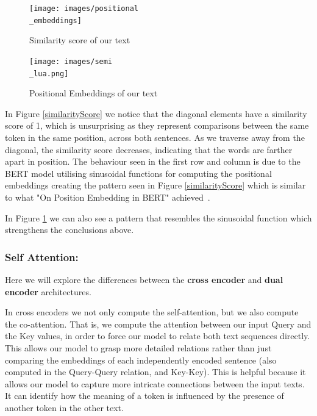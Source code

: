 \documentclass[runningheads]{llncs}
\begin{document}
\begin{figure}[htbp]
    \centering
    \begin{minipage}{0.5\textwidth}
        \centering
        \texttt{[image: images/positional\\\_embeddings]}
        \caption{Similarity score of our text}
        \label{similarityScore}
    \end{minipage}\hfill
    \begin{minipage}{0.45\textwidth}
        \centering
        \texttt{[image: images/semi\\\_lua.png]}
        \caption{Positional Embeddings of our text}
         \label{posEmb}
    \end{minipage}
\end{figure}

In Figure \ref{similarityScore} we notice that the diagonal elements have a similarity score of 1, which is unsurprising as they represent comparisons between the same token in the same position, across both sentences. As we traverse away from the diagonal, the similarity score decreases, indicating that the words are farther apart in position. The behaviour seen in the first row and column is due to the BERT model utilising sinusoidal functions for computing the positional embeddings creating the pattern seen in Figure \ref{similarityScore} which is similar to what "On Position Embedding in BERT" achieved~\cite{wang2021on}.

In Figure \ref{posEmb} we can also see a pattern that resembles the sinusoidal function which strengthens the conclusions above.
\subsubsection{Self Attention:} 
Here we will explore the differences between the \textbf{cross encoder} and \textbf{dual encoder} architectures.

In cross encoders we not only compute the self-attention, but we also compute the co-attention.
That is, we compute the attention between our input Query and the Key values, in order to force our model to relate both text sequences directly. This allows our model to grasp more detailed relations rather than just comparing the embeddings of each independently encoded sentence (also computed in the Query-Query relation, and Key-Key).
This is helpful because it allows our model to capture more intricate connections between the input texts. It can identify how the meaning of a token is influenced by the presence of another token in the other text.
\end{document}
